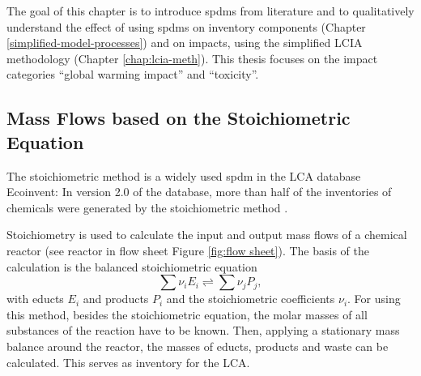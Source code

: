 The goal of this chapter is to introduce \acl{spdm}s from literature and to qualitatively understand the effect of using \aclp{spdm} on inventory components (Chapter \ref{simplified-model-processes}) and on impacts, using the simplified LCIA methodology (Chapter \ref{chap:lcia-meth}). This thesis focuses on the impact categories ``global warming impact'' and ``toxicity''. 


\subsection{Mass Flows based on the Stoichiometric Equation}
\label{stoichiometry}
The stoichiometric method is a widely used \acl{spdm} in the LCA database Ecoinvent: In version 2.0 of the database, more than half of the inventories of chemicals were generated by the stoichiometric method \cite{Althaus.2007}.

Stoichiometry is used to calculate the input and output mass flows of a chemical reactor \cite{Parvatker.2019} (see reactor in flow sheet Figure \ref{fig:flow sheet}). The basis of the calculation is the balanced stoichiometric equation \[ \sum{\nu_i E_i} \rightleftharpoons \sum{\nu_j P_j},\] with educts $E_i$ and products $P_i$ and  the stoichiometric coefficients $\nu_i$. For using this method, besides the stoichiometric equation, the molar masses of all substances of the reaction have to be known. Then, applying a stationary mass balance around the reactor, the masses of educts, products and waste can be calculated. This serves as inventory for the LCA.\\



